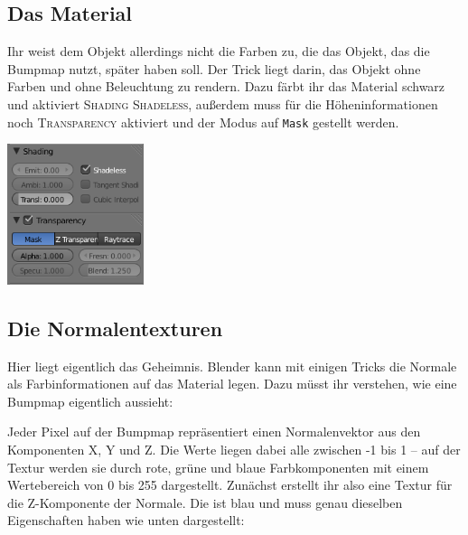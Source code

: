 \documentclass[a4paper]{article}
\newcommand{\ccaption}[1]{\textsc{#1}}
\newcommand{\cvalue}[1]{\texttt{#1}}
\newcommand{\rarrow}{\textrightarrow}
\begin{document}
\subsection{Das Material}
Ihr weist dem Objekt allerdings nicht die Farben zu, die das Objekt, das die Bumpmap nutzt, später haben soll. Der Trick liegt darin, das Objekt ohne
Farben und ohne Beleuchtung zu rendern. Dazu färbt ihr das Material schwarz und aktiviert \ccaption{Shading \rarrow Shadeless}, außerdem muss für die
Höheninformationen noch \ccaption{Transparency} aktiviert und der Modus auf \cvalue{Mask} gestellt werden.
\begin{center}
\includegraphics[width=40mm]{../images/blender/bumpmap-material.png}
\end{center}

\subsection{Die Normalentexturen}
Hier liegt eigentlich das Geheimnis. Blender kann mit einigen Tricks die Normale als Farbinformationen auf das Material legen. Dazu müsst ihr verstehen,
wie eine Bumpmap eigentlich aussieht:

Jeder Pixel auf der Bumpmap repräsentiert einen Normalenvektor aus den Komponenten X, Y und Z. Die Werte liegen dabei alle zwischen -1 bis 1 -- auf der
Textur werden sie durch rote, grüne und blaue Farbkomponenten mit einem Wertebereich von 0 bis 255 dargestellt. Zunächst erstellt ihr also eine Textur
für die Z-Komponente der Normale. Die ist blau und muss genau dieselben Eigenschaften haben wie unten dargestellt:
\end{document}
